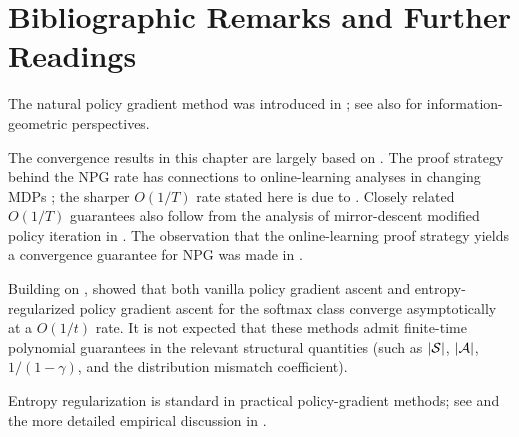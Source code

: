 \section{Bibliographic Remarks and Further Readings}\label{bib:pg_opt}

The natural policy gradient method was introduced in \cite{Kakade01}; see also
\cite{bagnell2003covariant,Peters:2008:NA:1352927.1352986} for information-geometric
perspectives.

The convergence results in this chapter are largely based on \cite{agarwal2019optimality}.
The proof strategy behind the NPG rate has connections to online-learning analyses in changing
MDPs \cite{even-dar2009online}; the sharper $O(1/T)$ rate stated here is due to
\cite{agarwal2019optimality}. Closely related $O(1/T)$ guarantees also follow from the analysis of
mirror-descent modified policy iteration in \cite{geist2019theory}. The observation that the
online-learning proof strategy yields a convergence guarantee for NPG was made in
\cite{DBLP:journals/corr/NeuJG17}.

Building on \cite{agarwal2019optimality}, \cite{mei2020global} showed that both vanilla policy
gradient ascent and entropy-regularized policy gradient ascent for the softmax class converge
asymptotically at a $O(1/t)$ rate. It is not expected that these methods admit finite-time
polynomial guarantees in the relevant structural quantities (such as $|\mathcal{S}|$, $|\mathcal{A}|$,
$1/(1-\gamma)$, and the distribution mismatch coefficient).

Entropy regularization is standard in practical policy-gradient methods; see
\cite{mnih2016asynchronous} and the more detailed empirical discussion in \cite{ahmed2019understanding}.

